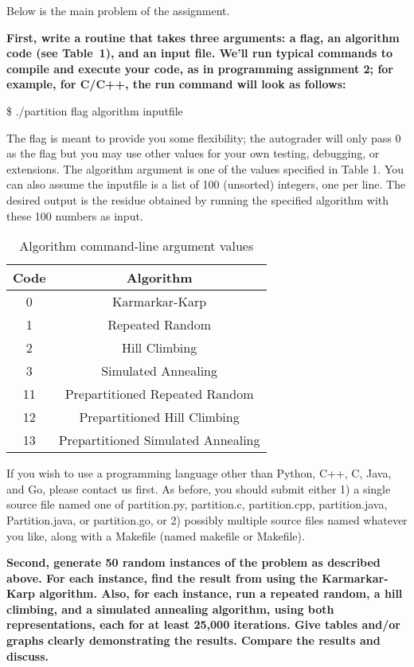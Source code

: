 \documentclass[11pt]{article}
\begin{document}
Below is the main problem of the assignment.

\smallskip 
{\bf First, write a routine that takes three arguments: a flag, an algorithm code (see Table~1), and an input file. We'll run typical commands to compile and execute your code, as in programming assignment 2; for example, for C/C++, the run command will look as follows:

\noindent \$ ./partition flag algorithm inputfile 

The flag is meant to provide you some flexibility; the autograder will only pass 0 as the flag but you may use other values for your own testing, debugging, or extensions. The algorithm argument is one of the values specified in Table 1. You can also assume the inputfile is a list of 100 (unsorted) integers, one per line. The desired output is the residue obtained by running the specified algorithm with these 100 numbers as input.}

\begin{table}[h]
    \centering
    \begin{tabular}{|c|c|}
        \hline
        Code & Algorithm \\
        \hline
        0 & Karmarkar-Karp\\
        1 & Repeated Random\\
        2 & Hill Climbing\\
        3 & Simulated Annealing\\
        11 & Prepartitioned Repeated Random\\
        12 & Prepartitioned Hill Climbing\\
        13 & Prepartitioned Simulated Annealing\\
        \hline
    \end{tabular}
    \caption{Algorithm command-line argument values}
    \label{tab:algorithm}
\end{table}

\smallskip 

If you wish to use a programming language other than Python, C++, C, Java, and Go, please contact us first.
As before, you should submit either 1) a single source file named one of partition.py, partition.c, partition.cpp, partition.java, Partition.java, or partition.go, or 2) possibly multiple
source files named whatever you like, along with a Makefile (named makefile or Makefile).

\smallskip 
{\bf Second, generate 50 random instances of the problem as described above.
For each instance, find the result from using the Karmarkar-Karp
algorithm.  Also, for each instance, run a repeated random, a hill
climbing, and a simulated annealing algorithm, using both
representations, each for at least 25,000 iterations.  Give tables and/or
graphs
clearly demonstrating the results.  Compare the
results and discuss.  }
\end{document}
